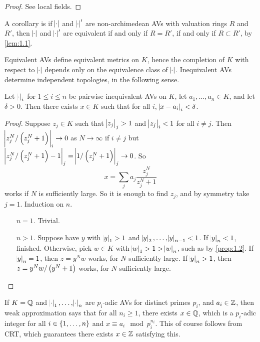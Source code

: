 \begin{proof}
See local fields.
\end{proof}

A corollary is if $ \abs{\cdot} $ and $ \abs{\cdot}' $ are non-archimedean AVs with valuation rings $ R $ and $ R' $, then $ \abs{\cdot} $ and $ \abs{\cdot}' $ are equivalent if and only if $ R = R' $, if and only if $ R \subset R' $, by \ref{lem:1.1}.

\pagebreak

Equivalent AVs define equivalent metrics on $ K $, hence the completion of $ K $ with respect to $ \abs{\cdot} $ depends only on the equivalence class of $ \abs{\cdot} $. Inequivalent AVs determine independent topologies, in the following sense.

\begin{proposition}
Let $ \abs{\cdot}_i $ for $ 1 \le i \le n $ be pairwise inequivalent AVs on $ K $, let $ a_1, \dots, a_n \in K $, and let $ \delta > 0 $. Then there exists $ x \in K $ such that for all $ i $, $ \abs{x - a_i}_i < \delta $.
\end{proposition}

\begin{proof}
Suppose $ z_j \in K $ such that $ \abs{z_j}_j > 1 $ and $ \abs{z_j}_i < 1 $ for all $ i \ne j $. Then $ \abs{z_j^N / \br{z_j^N + 1}}_i \to 0 $ as $ N \to \infty $ if $ i \ne j $ but $ \abs{z_j^N / \br{z_j^N + 1} - 1}_j = \abs{1 / \br{z_j^N + 1}}_j \to 0 $. So
$$ x = \sum_j a_j\dfrac{z_j^N}{z_j^N + 1} $$
works if $ N $ is sufficiently large. So it is enough to find $ z_j $, and by symmetry take $ j = 1 $. Induction on $ n $.
\begin{itemize}[leftmargin=0.5in]
\item[$ n = 1 $.] Trivial.
\item[$ n > 1 $.] Suppose have $ y $ with $ \abs{y}_1 > 1 $ and $ \abs{y}_2, \dots, \abs{y}_{n - 1} < 1 $. If $ \abs{y}_n < 1 $, finished. Otherwise, pick $ w \in K $ with $ \abs{w}_1 > 1 > \abs{w}_n $, such as by \ref{prop:1.2}. If $ \abs{y}_n = 1 $, then $ z = y^Nw $ works, for $ N $ sufficiently large. If $ \abs{y}_n > 1 $, then $ z = y^Nw / \br{y^N + 1} $ works, for $ N $ sufficiently large.
\end{itemize}
\end{proof}

\begin{remark*}
If $ K = \mathbb{Q} $ and $ \abs{\cdot}_1, \dots, \abs{\cdot}_n $ are $ p_i $-adic AVs for distinct primes $ p_i $, and $ a_i \in \mathbb{Z} $, then weak approximation says that for all $ n_i \ge 1 $, there exists $ x \in \mathbb{Q} $, which is a $ p_i $-adic integer for all $ i \in \cbr{1, \dots, n} $ and $ x \equiv a_i \mod p_i^{n_i} $. This of course follows from CRT, which guarantees there exists $ x \in \mathbb{Z} $ satisfying this.
\end{remark*}

